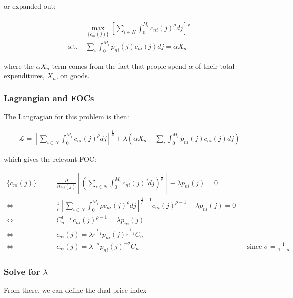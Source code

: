 \documentclass[10pt]{article}
\begin{document}
or expanded out:

\begin{align}
    &\underset{\{c_{n i}(j)\}}{\max} \left[\sum_{i \in N} \int_0^{M_i} c_{n i}(j)^\rho d j\right]^{\frac{1}{\rho}} \\
    \text{s.t. } &\sum_i \int_{0}^{M_i} p_{n i}(j) c_{n i}(j) d j=\alpha X_n
\end{align}

where the $\alpha X_n$ term comes from the fact that 
people spend $\alpha$ of their total expenditures, $X_n$,
on goods.

\subsubsection{Lagrangian and FOCs}

The Langragian for this problem is then:

\begin{align}
    \mathcal{L} = \left[\sum_{i \in N} \int_0^{M_i} c_{n i}(j)^\rho d j\right]^{\frac{1}{\rho}} + \lambda \left(\alpha X_n - \sum_i \int_{0}^{M_i} p_{n i}(j) c_{n i}(j) d j\right)
\end{align}

which gives the relevant FOC:

\begin{align}
    \{c_{n i}(j)\} \quad \quad &\frac{\partial}{\partial c_{n i}(j)} \left[\left(\sum_{i \in N} \int_0^{M_i} c_{n i}(j)^\rho d j\right)^{\frac{1}{\rho}}\right] - \lambda p_{n i}(j) = 0 \\
    \Leftrightarrow & \frac{1}{\rho} \left[\sum_{i \in N} \int_0^{M_i} \rho c_{n i}(j)^\rho d j\right]^{\frac{1}{\rho}-1} c_{n i}(j)^{\rho-1} - \lambda p_{n i}(j) = 0 \\
    \Leftrightarrow & C_n^{1-\rho} c_{n i}(j)^{\rho-1} = \lambda p_{n i}(j) \\
    \Leftrightarrow & c_{n i}(j) = \lambda^{\frac{1}{\rho -1}} p_{ni}(j)^{\frac{1}{\rho -1}} C_n \\ 
    \Leftrightarrow & c_{n i}(j) = \lambda^{-\sigma} p_{ni}(j)^{-\sigma} C_n && \text{since $\sigma = \frac{1}{1-\rho}$} \label{eq:inter_good_nij_cons}
\end{align}


\subsubsection{Solve for $\lambda$}

From there, we can define the dual price index 
\end{document}
